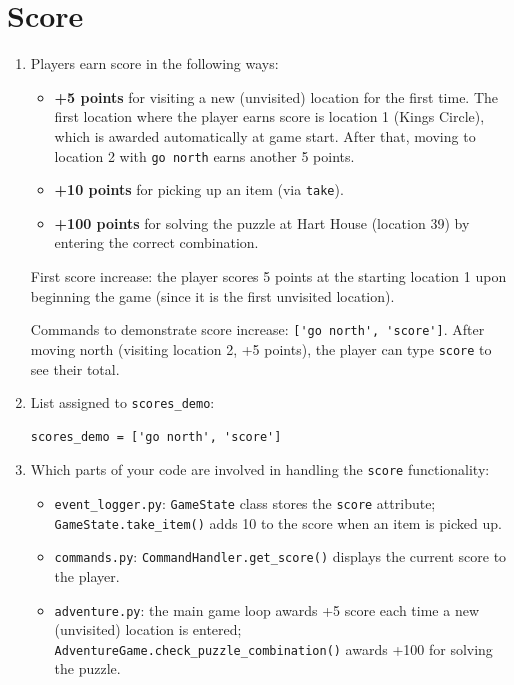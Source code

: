 \documentclass[11pt]{article}
\begin{document}
\section*{Score}
\begin{enumerate}

    \item Players earn score in the following ways:
    \begin{itemize}
        \item \textbf{+5 points} for visiting a new (unvisited) location for the first time. The first location where the player earns score is location 1 (Kings Circle), which is awarded automatically at game start. After that, moving to location 2 with \verb|go north| earns another 5 points.
        \item \textbf{+10 points} for picking up an item (via \verb|take|).
        \item \textbf{+100 points} for solving the puzzle at Hart House (location 39) by entering the correct combination.
    \end{itemize}
    First score increase: the player scores 5 points at the starting location 1 upon beginning the game (since it is the first unvisited location).

    Commands to demonstrate score increase: \verb|['go north', 'score']|. After moving north (visiting location 2, +5 points), the player can type \verb|score| to see their total.

    \item List assigned to \verb|scores_demo|:
\begin{verbatim}
scores_demo = ['go north', 'score']
\end{verbatim}

    \item Which parts of your code are involved in handling the \verb|score| functionality:
    \begin{itemize}
        \item \verb|event_logger.py|: \verb|GameState| class stores the \verb|score| attribute; \verb|GameState.take_item()| adds 10 to the score when an item is picked up.
        \item \verb|commands.py|: \verb|CommandHandler.get_score()| displays the current score to the player.
        \item \verb|adventure.py|: the main game loop awards +5 score each time a new (unvisited) location is entered; \verb|AdventureGame.check_puzzle_combination()| awards +100 for solving the puzzle.
    \end{itemize}
\end{enumerate}
\end{document}
